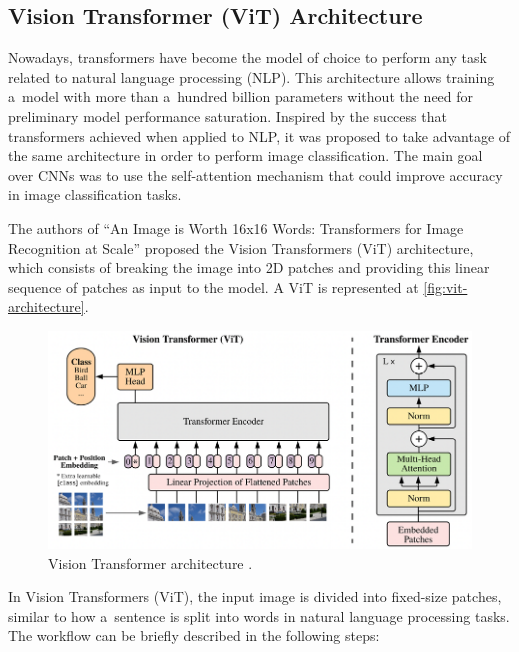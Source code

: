 \subsection*{Vision Transformer (ViT) Architecture}

Nowadays, transformers have become the model of choice to perform any task related to natural language processing (NLP). This architecture allows training a~model with more than a~hundred billion parameters without the need for preliminary model performance saturation. Inspired by the success that transformers achieved when applied to NLP, it was proposed to take advantage of the same architecture in order to perform image classification. The main goal over CNNs was to use the self-attention mechanism that could improve accuracy in image classification tasks.

The authors of \enquote{An Image is Worth 16x16 Words: Transformers for Image Recognition at Scale} \cite{dosovitskiy2021imageworth16x16words} proposed the Vision Transformers (ViT) architecture, which consists of breaking the image into 2D patches and providing this linear sequence of patches as input to the model. A ViT is represented at \autoref{fig:vit-architecture}.

\begin{figure}[htbp]
    \centering
    \includegraphics[width=0.8\linewidth]{obrazky-figures/02-theoretical-basis/vit-architecture.png}
    \caption{Vision Transformer architecture \cite{dosovitskiy2021imageworth16x16words}.}
    \label{fig:vit-architecture}
\end{figure}

In Vision Transformers (ViT), the input image is divided into fixed-size patches, similar to how a~sentence is split into words in natural language processing tasks. The workflow can be briefly described in the following steps:

